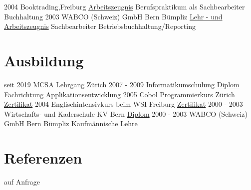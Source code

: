 \documentclass[a4paper]{twentysecondcv} %
\begin{document}
\begin{twenty}
	\twentyitem
    	{2004}
	{}
        {Booktrading,\textnormal{Freiburg}}
        {\hyperlink{booktrading}{\textcolor{pblue}{Arbeitszeugnis}}}
        {Berufspraktikum als Sachbearbeiter Buchhaltung}
	{}
	\twentyitem
    	{2003}
	{}
        {WABCO (Schweiz) GmbH \textnormal{Bern Bümpliz}}
        {\hyperlink{wabco}{\textcolor{pblue}{Lehr - und Arbeitszeugnis}}}
        {Sachbearbeiter Betriebsbuchhaltung/Reporting}
	{}	
\end{twenty}
\hypertarget{cert_back}{}
\section{Ausbildung}
\begin{twenty} %
	\twentyitem
    	{seit 2019}
        {}
        {MCSA Lehrgang \textnormal{Zürich}}
        {}
        {}
        {}	
	\twentyitem
    	{2007 - 2009}
	{}
        {Informatikumschulung}
        {\hyperlink{informatik}{\textcolor{pblue}{Diplom}}}
        {Fachrichtung Applikationsentwicklung}
        {}
	\twentyitem
    	{2005}
	{}
        {Cobol Programmierkurs \textnormal{Zürich}}
        {\hyperlink{cobol}{\textcolor{pblue}{Zertifikat}}}
        {}
        {}
	\twentyitem
    	{2004}
	{}
        {Englischintensivkurs beim WSI \textnormal{Freiburg}}
        {\hyperlink{toeic}{\textcolor{pblue}{Zertifikat}}}
        {}
        {}
	\twentyitem
    	{2000 - 2003}
        {}
        {Wirtschafts- und Kaderschule \textnormal{KV Bern}}
        {\hyperlink{kv}{\textcolor{pblue}{Diplom}}}
        {}
        {}
\twentyitem
    	{2000 - 2003}
	{}
        {WABCO (Schweiz) GmbH \textnormal{Bern Bümpliz}}
        {}
        {Kaufmännische Lehre}
	{}	%
\end{twenty}

\section{Referenzen}

\begin{twenty} %
\twentyitem
    	{auf Anfrage}
	{}
        {}
        {}
        {}
        {}
\end{twenty}
\newpage
\hypertarget{link}{}

\end{document}

